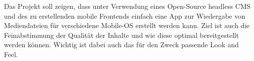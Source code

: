 \begin{spacing}{1}
    
    Das Projekt soll zeigen, dass unter Verwendung eines Open-Source headless CMS und des zu erstellenden mobile
    Frontends einfach eine App zur Wiedergabe von Mediendateien für verschiedene Mobile-OS erstellt werden kann.
    Ziel ist auch die Feinabstimmung der Qualität der Inhalte und wie diese optimal bereitgestellt werden können. 
    Wichtig ist dabei auch das für den Zweck passende Look and Feel.

\end{spacing}